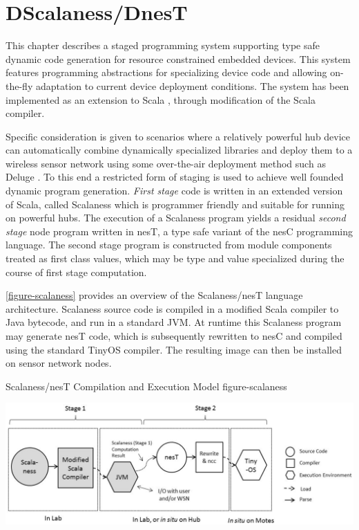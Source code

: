 
\chapter{DScalaness/DnesT}
\label{chapter-dscalaness-dnest}


This chapter describes a staged programming system supporting type safe dynamic code
generation for resource constrained embedded devices. This system features programming
abstractions for specializing device code and allowing on-the-fly adaptation to current device
deployment conditions. The system has been implemented as an extension to Scala \cite{PiS2},
through modification of the Scala compiler.

Specific consideration is given to scenarios where a relatively powerful hub device can
automatically combine dynamically specialized libraries and deploy them to a wireless sensor
network using some over-the-air deployment method such as Deluge \cite{deluge04}. To this end a
restricted form of staging \cite{Taha-MetaML,DBLP:conf/icess/Taha04,289140} is used to achieve
well founded dynamic program generation. \emph{First stage} code is written in an extended
version of Scala, called Scalaness which is programmer friendly and suitable for running on
powerful hubs. The execution of a Scalaness program yields a residual \emph{second stage} node
program written in nesT, a type safe variant of the nesC programming language. The second stage
program is constructed from module components treated as first class values, which may be type
and value specialized during the course of first stage computation.

\autoref{figure-scalaness} provides an overview of the Scalaness/nesT language architecture.
Scalaness source code is compiled in a modified Scala compiler to Java bytecode, and run in a
standard JVM. At runtime this Scalaness program may generate nesT code, which is subsequently
rewritten to nesC and compiled using the standard TinyOS compiler. The resulting image can then
be installed on sensor network nodes.

\begin{fpfig*}[t]
  {Scalaness/nesT Compilation and Execution Model}
  {figure-scalaness}
  \begin{center}
    \includegraphics[scale=.54]{Figures/scalaness.eps}
  \end{center}
\end{fpfig*}


